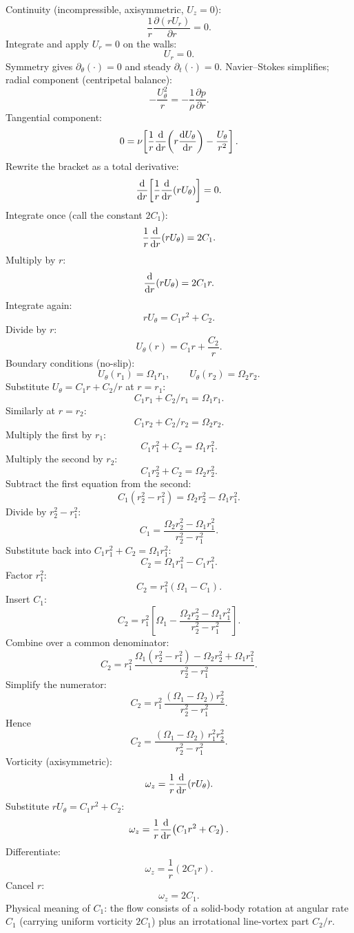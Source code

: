 \documentclass[11pt]{article}
\newcommand{\pd}[2]{\frac{\partial #1}{\partial #2}}
\begin{document}
Continuity (incompressible, axisymmetric, $U_z=0$):
\[ \frac{1}{r}\pd{(rU_r)}{r} = 0. \]
Integrate and apply $U_r=0$ on the walls:
\[ U_r = 0. \]
Symmetry gives $\partial_\theta(\cdot)=0$ and steady $\partial_t(\cdot)=0$. Navier--Stokes simplifies; radial component (centripetal balance):
\begin{equation}
-\frac{U_\theta^{2}}{r} = -\frac{1}{\rho}\pd{p}{r}.
\label{eq:nsr}
\end{equation}
Tangential component:
\begin{equation}
0 = \nu\!\left[\frac{1}{r}\dv{r}\!\left(r\dv{U_\theta}{r}\right) - \frac{U_\theta}{r^2}\right].
\label{eq:nstheta}
\end{equation}
Rewrite the bracket as a total derivative:
\[ \dv{r}\!\left[\frac{1}{r}\dv{r}(rU_\theta)\right] = 0. \]
Integrate once (call the constant $2C_1$):
\[ \frac{1}{r}\dv{r}(rU_\theta) = 2 C_1. \]
Multiply by $r$:
\[ \dv{r}(rU_\theta) = 2C_1 r. \]
Integrate again:
\[ rU_\theta = C_1 r^2 + C_2. \]
Divide by $r$:
\[ U_\theta(r) = C_1 r + \frac{C_2}{r}. \]
Boundary conditions (no-slip):
\[ U_\theta(r_1) = \Omega_1 r_1,\qquad U_\theta(r_2) = \Omega_2 r_2. \]
Substitute $U_\theta = C_1 r + C_2/r$ at $r=r_1$:
\[ C_1 r_1 + C_2/r_1 = \Omega_1 r_1. \]
Similarly at $r=r_2$:
\[ C_1 r_2 + C_2/r_2 = \Omega_2 r_2. \]
Multiply the first by $r_1$:
\[ C_1 r_1^2 + C_2 = \Omega_1 r_1^2. \]
Multiply the second by $r_2$:
\[ C_1 r_2^2 + C_2 = \Omega_2 r_2^2. \]
Subtract the first equation from the second:
\[ C_1(r_2^2 - r_1^2) = \Omega_2 r_2^2 - \Omega_1 r_1^2. \]
Divide by $r_2^2-r_1^2$:
\[ \boxed{\;C_1 = \frac{\Omega_2 r_2^2 - \Omega_1 r_1^2}{r_2^2 - r_1^2}.\;} \]
Substitute back into $C_1 r_1^2 + C_2 = \Omega_1 r_1^2$:
\[ C_2 = \Omega_1 r_1^2 - C_1 r_1^2. \]
Factor $r_1^2$:
\[ C_2 = r_1^2(\Omega_1 - C_1). \]
Insert $C_1$:
\[ C_2 = r_1^2\!\left[\Omega_1 - \frac{\Omega_2 r_2^2 - \Omega_1 r_1^2}{r_2^2 - r_1^2}\right]. \]
Combine over a common denominator:
\[ C_2 = r_1^2\,\frac{\Omega_1(r_2^2-r_1^2) - \Omega_2 r_2^2 + \Omega_1 r_1^2}{r_2^2-r_1^2}. \]
Simplify the numerator:
\[ C_2 = r_1^2\,\frac{(\Omega_1-\Omega_2)r_2^2}{r_2^2-r_1^2}. \]
Hence
\[ \boxed{\;C_2 = \frac{(\Omega_1-\Omega_2)\,r_1^2 r_2^2}{r_2^2 - r_1^2}.\;} \]
Vorticity (axisymmetric):
\[ \omega_z = \frac{1}{r}\dv{r}(rU_\theta). \]
Substitute $rU_\theta = C_1 r^2 + C_2$:
\[ \omega_z = \frac{1}{r}\dv{r}\!\left(C_1 r^2 + C_2\right). \]
Differentiate:
\[ \omega_z = \frac{1}{r}(2 C_1 r). \]
Cancel $r$:
\[ \omega_z = 2C_1. \]
Physical meaning of $C_1$: the flow consists of a solid-body rotation at angular rate $C_1$ (carrying uniform vorticity $2C_1$) plus an irrotational line-vortex part $C_2/r$.
\end{document}
